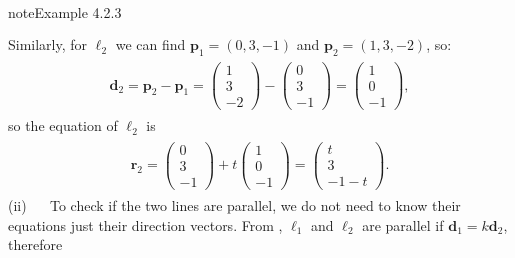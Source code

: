 \documentclass[letterpaper,10pt,english]{jupyterBook}
\begin{document}
\begin{sphinxadmonition}{note}{Example 4.2.3}
\begin{equation*}
\begin{split}
\begin{align*}
\end{align*} \end{split}
\end{equation*}
\sphinxAtStartPar
Similarly, for \(\ell_2\) we can find \(\mathbf{p}_1 = (0, 3, -1)\) and \(\mathbf{p}_2 = (1, 3, -2)\), so:
\begin{equation*}
\begin{split} \begin{align*}
    \mathbf{d}_2 = \mathbf{p}_2 - \mathbf{p}_1 = 
    \begin{pmatrix} 1 \\ 3 \\ -2 \end{pmatrix} - 
    \begin{pmatrix} 0 \\ 3 \\ -1 \end{pmatrix} =
    \begin{pmatrix} 1 \\ 0 \\ -1 \end{pmatrix},
\end{align*} \end{split}
\end{equation*}
\sphinxAtStartPar
so the equation of \(\ell_2\) is
\begin{equation*}
\begin{split} \begin{align*}
    \mathbf{r}_2 = \begin{pmatrix} 0 \\ 3 \\ -1 \end{pmatrix} + t \begin{pmatrix} 1 \\ 0 \\ -1 \end{pmatrix} = \begin{pmatrix} t \\ 3 \\ -1 -t \end{pmatrix}.
\end{align*} \end{split}
\end{equation*}
\sphinxAtStartPar
(ii)   To check if the two lines are parallel, we do not need to know their equations \sphinxhyphen{} just their direction vectors. From {\hyperref[\detokenize{_pages/4.1_Lines:parallel-lines-definition}]{}}, \(\ell_1\) and \(\ell_2\) are parallel if \(\mathbf{d}_1 = k\mathbf{d}_2\), therefore

\end{sphinxadmonition}
\end{document}
